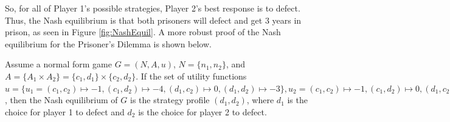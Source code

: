 So, for all of Player 1's possible strategies, Player 2's best response is to defect. Thus, the Nash equilibrium is that both prisoners will defect and get 3 years in prison, as seen in Figure \ref{fig:NashEquil}. A more robust proof of the Nash equilibrium for the Prisoner's Dilemma is shown below.

\begin{thm}
  Assume a normal form game $G = (N, A, u)$, $N=\{n_1, n_2\}$, and $A=\{A_1\times A_2\} = \{c_1, d_1\}\times\{c_2, d_2\}$. If the set of utility functions $u = \{u_1=(c_1, c_2)\mapsto -1, (c_1, d_2)\mapsto -4, (d_1, c_2)\mapsto 0, (d_1, d_2)\mapsto -3\}, u_2=(c_1, c_2)\mapsto -1, (c_1, d_2)\mapsto 0, (d_1, c_2)\mapsto -4, (d_1, d_2)\mapsto -3$, then the Nash equilibrium of $G$ is the strategy profile $(d_1, d_2)$, where $d_1$ is the choice for player 1 to defect and $d_2$ is the choice for player 2 to defect.
\end{thm}
